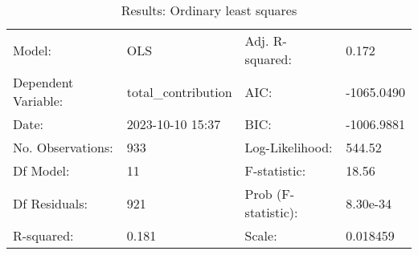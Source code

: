 \begin{table}
\caption{Results: Ordinary least squares}
\label{}
\begin{center}
\begin{tabular}{llll}
\hline
Model:              & OLS                 & Adj. R-squared:     & 0.172       \\
Dependent Variable: & total\_contribution & AIC:                & -1065.0490  \\
Date:               & 2023-10-10 15:37    & BIC:                & -1006.9881  \\
No. Observations:   & 933                 & Log-Likelihood:     & 544.52      \\
Df Model:           & 11                  & F-statistic:        & 18.56       \\
Df Residuals:       & 921                 & Prob (F-statistic): & 8.30e-34    \\
R-squared:          & 0.181               & Scale:              & 0.018459    \\
\hline
\end{tabular}
\end{center}


\end{table}
